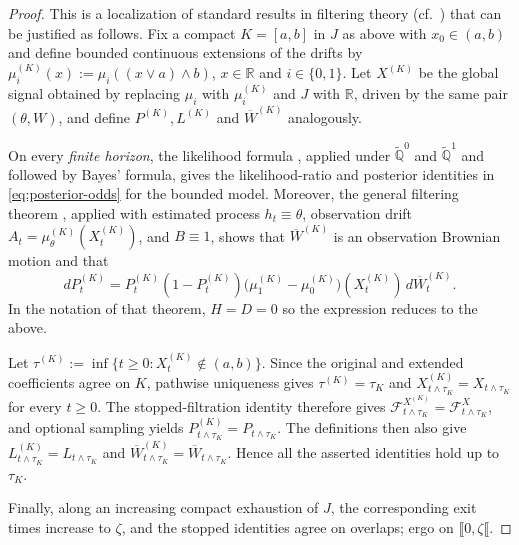 \documentclass[11pt, reqno]{amsart}
\theoremstyle{plain}
\theoremstyle{remark}
\numberwithin{equation}{section}
\begin{document}
\begin{proof}
This is a localization of standard results in filtering theory (cf.~\cite{bain-crisan,liptser-shiryaev}) %
%
that can be justified as follows. Fix a compact $K=[a,b]$ in $J$ as above with $x_0\in(a,b)$ and define bounded
continuous extensions of the drifts by
$\mu_i^{(K)}(x):=\mu_i((x\vee a)\wedge b)$, $x\in\mathbb R$ and
$i\in\{0,1\}$. Let $X^{(K)}$ be the global signal obtained by
replacing $\mu_i$ with $\mu_i^{(K)}$ and $J$ with $\mathbb R$, driven
by the same pair $(\theta,W)$, and define
$P^{(K)},L^{(K)}$ and $\overline W^{(K)}$ analogously.

On every \emph{finite horizon}, the likelihood formula
\cite[Theorem~7.1 and the subsequent corollary]{liptser-shiryaev},
applied under $\widetilde{\mathbb Q}^0$ and $\widetilde{\mathbb Q}^1$ and
followed by Bayes' formula, gives the likelihood-ratio and posterior
identities in \eqref{eq:posterior-odds} for the bounded model.
Moreover, the general filtering theorem
\cite[Theorem~8.1]{liptser-shiryaev}, applied with estimated process
$h_t\equiv\theta$, observation drift
$A_t=\mu_\theta^{(K)}(X_t^{(K)})$, and $B\equiv1$, shows that
$\overline W^{(K)}$ is an observation Brownian motion and that
\[
  dP_t^{(K)}
  =
  P_t^{(K)}(1-P_t^{(K)})
  \bigl(\mu_1^{(K)}-\mu_0^{(K)}\bigr)(X_t^{(K)})
  \,d\overline W_t^{(K)}.
\]
In the notation of that theorem, $H=D=0$ so the expression reduces to the above.

Let
$\tau^{(K)}:=\inf\{t\geq0:X_t^{(K)}\notin(a,b)\}$. Since the original
and extended coefficients agree on $K$, pathwise uniqueness gives
$\tau^{(K)}=\tau_K$ and
$X^{(K)}_{t\wedge\tau_K}=X_{t\wedge\tau_K}$ for every $t\geq0$.
The stopped-filtration identity
\cite[Lemma~2.32]{bain-crisan} therefore gives
$\mathcal F_{t\wedge\tau_K}^{X^{(K)}}
 =\mathcal F_{t\wedge\tau_K}^{X}$, and optional sampling yields
$P_{t\wedge\tau_K}^{(K)}=P_{t\wedge\tau_K}$. The definitions then
also give
$L_{t\wedge\tau_K}^{(K)}=L_{t\wedge\tau_K}$ and
$\overline W_{t\wedge\tau_K}^{(K)}
 =\overline W_{t\wedge\tau_K}$. Hence all the asserted identities
hold up to $\tau_K$.

Finally, along an increasing compact exhaustion of $J$, the
corresponding exit times increase to $\zeta$, and the stopped
identities agree on overlaps; ergo on
$\llbracket0,\zeta\llbracket$.
%
\end{proof}
\end{document}

